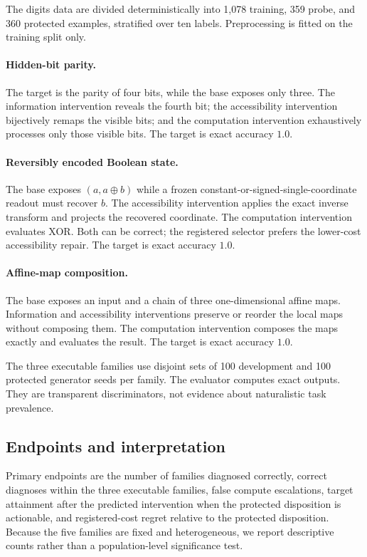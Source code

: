 \documentclass[10pt]{article}
\begin{document}
The digits data are divided deterministically into 1,078 training, 359 probe, and 360 protected examples, stratified over ten labels. Preprocessing is fitted on the training split only.

\paragraph{Hidden-bit parity.}
The target is the parity of four bits, while the base exposes only three. The information intervention reveals the fourth bit; the accessibility intervention bijectively remaps the visible bits; and the computation intervention exhaustively processes only those visible bits. The target is exact accuracy $1.0$.

\paragraph{Reversibly encoded Boolean state.}
The base exposes $(a,a\oplus b)$ while a frozen constant-or-signed-single-coordinate readout must recover $b$. The accessibility intervention applies the exact inverse transform and projects the recovered coordinate. The computation intervention evaluates XOR. Both can be correct; the registered selector prefers the lower-cost accessibility repair. The target is exact accuracy $1.0$.

\paragraph{Affine-map composition.}
The base exposes an input and a chain of three one-dimensional affine maps. Information and accessibility interventions preserve or reorder the local maps without composing them. The computation intervention composes the maps exactly and evaluates the result. The target is exact accuracy $1.0$.

The three executable families use disjoint sets of 100 development and 100 protected generator seeds per family. The evaluator computes exact outputs. They are transparent discriminators, not evidence about naturalistic task prevalence.

\subsection{Endpoints and interpretation}

Primary endpoints are the number of families diagnosed correctly, correct diagnoses within the three executable families, false compute escalations, target attainment after the predicted intervention when the protected disposition is actionable, and registered-cost regret relative to the protected disposition. Because the five families are fixed and heterogeneous, we report descriptive counts rather than a population-level significance test.
\end{document}
